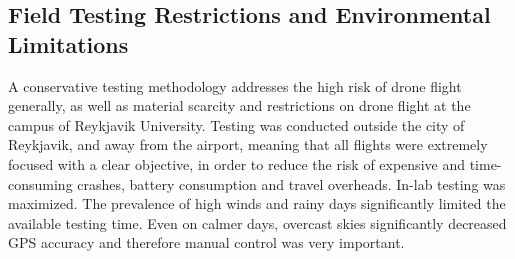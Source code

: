 \subsection{Field Testing Restrictions and Environmental Limitations}

A conservative testing methodology addresses the high risk of drone flight generally, as well as material scarcity and restrictions on drone flight at the campus of Reykjavik University. Testing was conducted outside the city of Reykjavik, and away from the airport, meaning that all flights were extremely focused with a clear objective, in order to reduce the risk of expensive and time-consuming crashes, battery consumption and travel overheads. In-lab testing was maximized. The prevalence of high winds and rainy days significantly limited the available testing time. Even on calmer days, overcast skies significantly decreased GPS accuracy and therefore manual control was very important.